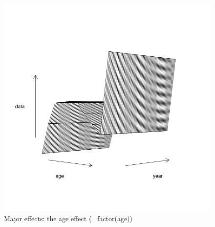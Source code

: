 \documentclass[a4paper,english,11pt]{article}
\begin{document}
\begin{knitrout}
\color{fgcolor}\begin{kframe}
\begin{alltt}
\hldef{(}  \hldef{=} \hldef{)}
\end{alltt}
\end{kframe}\begin{figure}[H]

{\centering \includegraphics[width=.9\linewidth]{figure/majeffa-1} 

}

\caption[Major effects]{Major effects: the age effect (~ factor(age))}\label{fig:majeffa}
\end{figure}

\end{knitrout}
\end{document}
